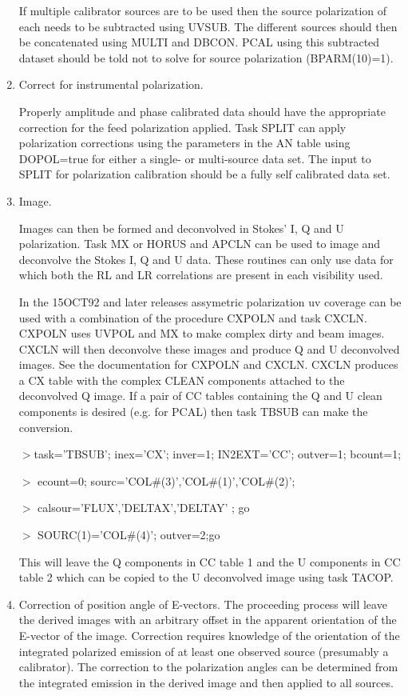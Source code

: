 \begin{enumerate}
   If multiple calibrator sources are to be used then the source
polarization of each needs to be subtracted using UVSUB.  The
different sources should then be  concatenated using MULTI and DBCON.
PCAL using this subtracted dataset should be told not to solve for
source polarization (BPARM(10)=1).

\item Correct for instrumental polarization.

   Properly amplitude and phase calibrated data should have the
appropriate correction for the feed polarization applied. Task SPLIT
can apply polarization corrections using the parameters in the AN
table using DOPOL=true for either a single- or multi-source data set.
The input to  SPLIT for polarization calibration should be a fully
self calibrated data set.

\item Image.

   Images can then be formed and deconvolved in Stokes' I, Q and U
polarization.  Task MX or HORUS and APCLN can be used to image and
deconvolve the Stokes I, Q and U data.  These routines can only use
data for which both the RL and LR correlations are present in each
visibility used.

   In the 15OCT92 and later releases assymetric polarization uv
coverage can be used with a combination of the procedure CXPOLN and
task CXCLN.  CXPOLN uses UVPOL and MX to make complex dirty and beam
images.  CXCLN will then deconvolve these images and produce Q and U
deconvolved images.  See the documentation for CXPOLN and CXCLN.
   CXCLN produces a CX table with the complex CLEAN components
attached to the deconvolved Q image.  If a
pair of CC tables containing the Q and U clean components is desired
(e.g. for PCAL) then task TBSUB can make the conversion.
\par\noindent
$>$task='TBSUB'; inex='CX'; inver=1;  IN2EXT='CC'; outver=1; bcount=1;
\par\noindent
$>$ ecount=0; sourc='COL\#(3)','COL\#(1)','COL\#(2)';
\par\noindent
$>$ calsour='FLUX','DELTAX','DELTAY' ; go
\par\noindent
$>$ SOURC(1)='COL\#(4)'; outver=2;go

   This will leave the Q components in CC table 1 and the U components
in CC table 2 which can be copied to the U deconvolved image using
task TACOP.


\item Correction of position angle of E-vectors.
   The proceeding process will leave the derived images with an
arbitrary offset in the apparent orientation of the E-vector of the
image.  Correction requires knowledge of the orientation of the
integrated polarized emission of at least one observed source
(presumably a calibrator).  The correction to the polarization angles
can be determined from the integrated emission in the derived image
and then applied to all sources.


\end{enumerate}
